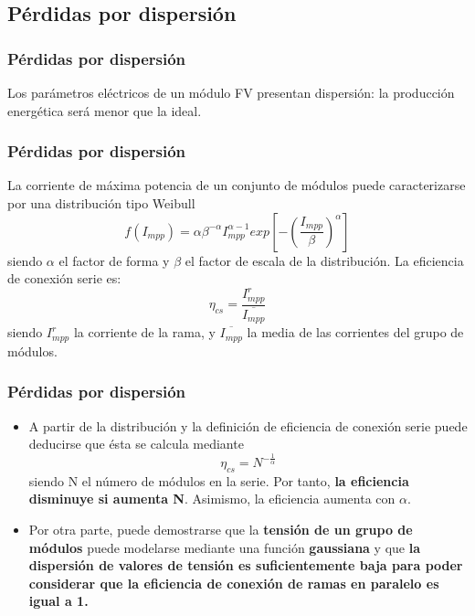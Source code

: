 \documentclass[xcolor=dvipsnames]{beamer}
\begin{document}
\subsection{Pérdidas por dispersión}


\begin{frame}
  \frametitle{Pérdidas por dispersión}

\begin{block}{}
  Los parámetros eléctricos de un módulo FV presentan dispersión: la
  producción energética será menor que la ideal.
\end{block}

\end{frame}

\begin{frame}
  \frametitle{Pérdidas por dispersión}

\begin{block}{}
  La corriente de máxima potencia de un conjunto de módulos puede
  caracterizarse por una distribución tipo Weibull\[
  f(I_{mpp})=\alpha\beta^{-\alpha}I_{mpp}^{\alpha-1}exp\left[-\left(\frac{I_{mpp}}{\beta}\right)^{\alpha}\right]\]
  siendo $\alpha$ el factor de forma y $\beta$ el factor de escala de
  la distribución. La eficiencia de conexión serie es:\[
  \eta_{cs}=\frac{I_{mpp}^{r}}{\overline{I_{mpp}}}\] siendo
  $I_{mpp}^{r}$ la corriente de la rama, y $\overline{I_{mpp}}$ la
  media de las corrientes del grupo de módulos.

\end{block}

\end{frame}

\begin{frame}
  \frametitle{Pérdidas por dispersión}
  \begin{itemize}
  \item A partir de la distribución y la definición de eficiencia de
    conexión serie puede deducirse que ésta se calcula mediante\[
    \eta_{cs}=N^{-\frac{1}{\alpha}}\] siendo N el número de módulos en
    la serie. Por tanto, \textbf{la eficiencia disminuye si aumenta
      N}. Asimismo, la eficiencia aumenta con $\alpha$.
  \item Por otra parte, puede demostrarse que la \textbf{tensión de un
      grupo de módulos} puede modelarse mediante una función
    \textbf{gaussiana} y que \textbf{la dispersión de valores de
      tensión es suficientemente baja para poder considerar que la
      eficiencia de conexión de ramas en paralelo es igual a 1.}
  \end{itemize}

\end{frame}
\end{document}
